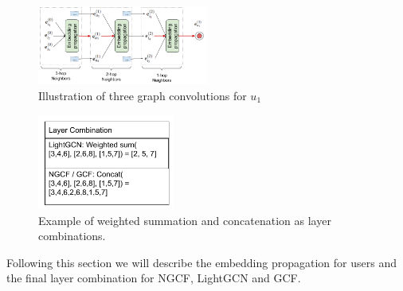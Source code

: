 \begin{figure}[h!]
    \includegraphics[width=0.5\textwidth]{figures/embedding-convolutions.png}
    \centering
    \caption{Illustration of three graph convolutions for $u_1$}
    \label{fig:gcn-convolutions}
\end{figure}
\begin{figure}[h!]
    \includegraphics[width=0.4\textwidth]{figures/layer-combination.png}
    \centering
    \caption{Example of weighted summation and concatenation as layer combinations.}
    \label{fig:layer-combination}
\end{figure}
Following this section we will describe the embedding propagation for users and the final layer combination for NGCF, LightGCN and GCF.

